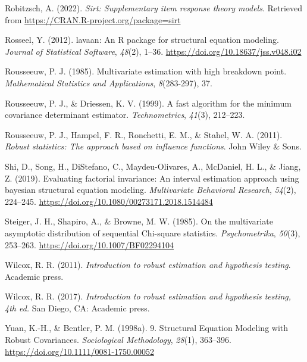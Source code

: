 \documentclass[
  man]{apa7}
\newlength{\cslhangindent}
\newenvironment{CSLReferences}[2] %
 {\begin{list}{}{%
  \setlength{\itemindent}{0pt}
  \setlength{\leftmargin}{0pt}
  \setlength{\parsep}{0pt}
  \ifodd #1
   \setlength{\leftmargin}{\cslhangindent}
   \setlength{\itemindent}{-1\cslhangindent}
  \fi
  \setlength{\itemsep}{#2\baselineskip}}}
 {\end{list}}
\begin{document}
\begin{CSLReferences}{1}{0}
Robitzsch, A. (2022). \emph{Sirt: Supplementary item response theory models}. Retrieved from \url{https://CRAN.R-project.org/package=sirt}

Rosseel, Y. (2012). {lavaan}: An {R} package for structural equation modeling. \emph{Journal of Statistical Software}, \emph{48}(2), 1--36. \url{https://doi.org/10.18637/jss.v048.i02}

Rousseeuw, P. J. (1985). Multivariate estimation with high breakdown point. \emph{Mathematical Statistics and Applications}, \emph{8}(283-297), 37.

Rousseeuw, P. J., \& Driessen, K. V. (1999). A fast algorithm for the minimum covariance determinant estimator. \emph{Technometrics}, \emph{41}(3), 212--223.

Rousseeuw, P. J., Hampel, F. R., Ronchetti, E. M., \& Stahel, W. A. (2011). \emph{Robust statistics: The approach based on influence functions}. John Wiley \& Sons.

Shi, D., Song, H., DiStefano, C., Maydeu-Olivares, A., McDaniel, H. L., \& Jiang, Z. (2019). Evaluating factorial invariance: An interval estimation approach using bayesian structural equation modeling. \emph{Multivariate Behavioral Research}, \emph{54}(2), 224--245. \url{https://doi.org/10.1080/00273171.2018.1514484}

Steiger, J. H., Shapiro, A., \& Browne, M. W. (1985). On the multivariate asymptotic distribution of sequential {Chi}-square statistics. \emph{Psychometrika}, \emph{50}(3), 253--263. \url{https://doi.org/10.1007/BF02294104}

Wilcox, R. R. (2011). \emph{Introduction to robust estimation and hypothesis testing}. Academic press.

Wilcox, R. R. (2017). \emph{Introduction to robust estimation and hypothesis testing, \emph{4th ed.}} San Diego, CA: Academic press.

Yuan, K.-H., \& Bentler, P. M. (1998a). 9. {Structural} {Equation} {Modeling} with {Robust} {Covariances}. \emph{Sociological Methodology}, \emph{28}(1), 363--396. \url{https://doi.org/10.1111/0081-1750.00052}


\end{CSLReferences}
\end{document}

